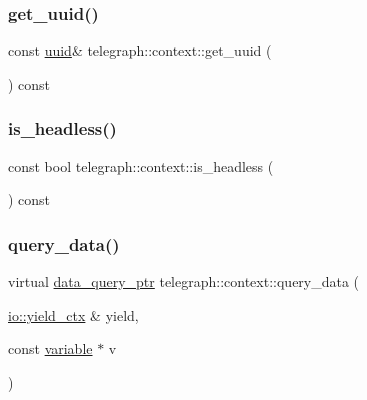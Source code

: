 \mbox{\label{classtelegraph_1_1context_adfc55d7a2ba9d68c1f52abcbac7d74fd}} 
\subsubsection{\texorpdfstring{get\+\_\+uuid()}{get\_uuid()}}
{\footnotesize\ttfamily const \hyperlink{namespacetelegraph_a51ee91d7eaeef067f7ccac2b170e5d59}{uuid}\& telegraph\+::context\+::get\+\_\+uuid (\begin{DoxyParamCaption}{ }\end{DoxyParamCaption}) const\hspace{0.3cm}{\ttfamily [inline]}}

\mbox{\label{classtelegraph_1_1context_a4cfaa125584e2f5ee5121c074bc024f1}} 
\subsubsection{\texorpdfstring{is\+\_\+headless()}{is\_headless()}}
{\footnotesize\ttfamily const bool telegraph\+::context\+::is\+\_\+headless (\begin{DoxyParamCaption}{ }\end{DoxyParamCaption}) const\hspace{0.3cm}{\ttfamily [inline]}}

\mbox{\label{classtelegraph_1_1context_a301114c9b73194507ae58221566a3e57}} 
\subsubsection{\texorpdfstring{query\+\_\+data()}{query\_data()}\hspace{0.1cm}{\footnotesize\ttfamily [1/2]}}
{\footnotesize\ttfamily virtual \hyperlink{namespacetelegraph_a6ffe775ac48dca2a4013b53d692199c8}{data\+\_\+query\+\_\+ptr} telegraph\+::context\+::query\+\_\+data (\begin{DoxyParamCaption}\item[{\hyperlink{structboost_1_1asio_1_1yield__ctx}{io\+::yield\+\_\+ctx} \&}]{yield,  }\item[{const \hyperlink{classtelegraph_1_1variable}{variable} $\ast$}]{v }\end{DoxyParamCaption})\hspace{0.3cm}{\ttfamily [pure virtual]}}



